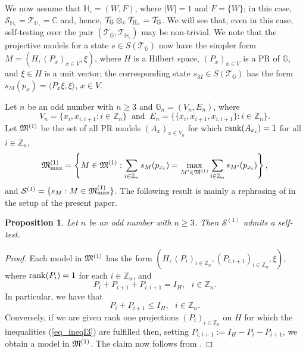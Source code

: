 \documentclass[11pt]{amsart}
\newtheorem{proposition}[theorem]{Proposition}
\theoremstyle{definition}
\newcommand{\cl}[1]{\mathcal{#1}}
\newcommand{\bb}[1]{\mathbb{#1}}
\begin{document}
We now assume that 
$\bb{H}_{\circ} = (W,F)$, where $|W| = 1$ and $F = \{W\}$; in this case,
$\cl S_{\bb{H}_{\circ}} = \cl T_{\bb{H}_{\circ}} = \bb{C}$ and, hence, 
$\cl T_{\bb{G}} \otimes_{\rm c} \cl T_{\bb{H}_{\circ}} = \cl T_{\bb{G}}$. 
We will see that, even in 
this case, self-testing over the pair $(\cl T_{\bb{G}},\cl T_{\bb{H}_{\circ}})$
may be non-trivial. 
We note that the projective models for a state $s\in S(\cl T_{\bb{G}})$ now have the simpler form 
$M = (H,(P_x)_{x\in V},\xi)$, where $H$ is a Hilbert space, $(P_x)_{x\in V}$ is a 
PR of $\bb{G}$, and $\xi\in H$ is a unit vector; the corresponding state 
$s_M\in S(\cl T_{\bb{G}})$
has the form $s_M(p_x) = \langle P_x\xi,\xi\rangle$, $x\in V$. 

Let $n$ be an odd number with $n\geq 3$ and $\bb{G}_n = (V_n,E_n)$, where 
$$V_n = \{x_i, x_{i,i+1} : i \in \bb{Z}_n\} \ \mbox{ and } \ 
E_n = \{\{x_i,x_{i+1},x_{i,i+1}\} : i\in \bb{Z}_n\}.$$
Let $\frak{M}^{(1)}$ be the set of all PR models 
$(A_x)_{x\in V_n}$ for which ${\rm rank} (A_{x_i}) = 1$
for all $i\in \bb{Z}_n$, 
$$\frak{M}^{(1)}_{\max} = \left\{M\in \frak{M}^{(1)} : 
\sum_{i\in \bb{Z}_n} s_M(p_{x_i}) = 
\max_{M'\in \frak{M}^{(1)}} \sum_{i\in \bb{Z}_n} s_{M'}(p_{x_i})\right\},
$$
and 
$\cl S^{(1)} = \{s_M : M\in \frak{M}^{(1)}_{\max}\}$.
The following result is mainly a rephrasing of 
\cite[Main Theorem]{brv-etal} 
in the setup of the present paper.



\begin{proposition}\label{p_consel}
Let $n$ be an odd number with $n \geq 3$. 
Then $\cl S^{(1)}$ admits a self-test. 
\end{proposition}

\begin{proof}
Each model in $\frak{M}^{(1)}$ has the form 
$(H, (P_i)_{i\in \bb{Z}_n}, (P_{i,i+1})_{i\in \bb{Z}_n},\xi)$, where ${\rm rank}(P_i) = 1$ for each $i\in \bb{Z}_n$, and
$$P_i + P_{i+1} + P_{i,i+1} = I_H, \ \ \ i\in \bb{Z}_n.$$
In particular, we have that 
\begin{equation}\label{eq_ineqI3}
P_i + P_{i+1}\leq I_H, \ \ \ i\in \bb{Z}_n.
\end{equation}
Conversely, if we are given rank one projections $(P_i)_{i\in \bb{Z}_n}$ on $H$ 
for which the inequalities (\ref{eq_ineqI3}) are fulfilled then, setting 
$P_{i,i+1} := I_H - P_i - P_{i+1}$, we obtain a model 
in $\frak{M}^{(1)}$. 
The claim now follows from 
\cite[Main Theorem]{brv-etal}. 
\end{proof}
\end{document}

